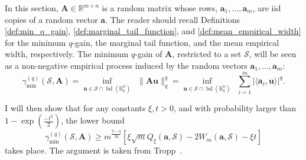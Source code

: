 In this section, $\mathbf{A} \in \mathbb{R}^{m \times n}$ is a random matrix whose rows, $\mathbf{a}_1, \dots, \mathbf{a}_m$, are \acrshort{iid} copies of a random vector $\mathbf{a}$. The reader should recall Definitions \ref{def:min_q_gain}, \ref{def:marginal_tail_function}, and \ref{def:mean_empirical_width} for the minimum $q$-gain, the marginal tail function, and the mean empirical width, respectively. The minimum $q$-gain of $\mathbf{A}$, restricted to a set $\mathcal{S}$, will be seen as a non-negative empirical process induced by the random vectors $\mathbf{a}_1, \dots, \mathbf{a}_m$:
\begin{equation*}
    \gamma_{\min}^{(q)} \left ( \mathcal{S}, \mathbf{A} \right ) = \underset{\mathbf{u} \in \mathcal{S} \cap \operatorname{bd}(\mathbb{B}^{n}_q)}{\inf} \enspace \|\mathbf{A u}\|_q^q = \underset{\mathbf{u} \in \mathcal{S} \cap \operatorname{bd}(\mathbb{B}^{n}_q)}{\inf} \enspace \sum_{i=1}^{m} \left | \langle \mathbf{a}_i, \mathbf{u} \rangle \right |^q.
\end{equation*}

I will then show that for any constants $\xi, t > 0$, and with probability larger than $1 - \exp \left ( \frac{-t^2}{2} \right )$, the lower bound
\begin{equation*}
    \gamma_{\min}^{(q)} \left ( \mathcal{S}, \mathbf{A} \right ) \geq m^{\frac{2 - q}{2q}} \left [ \xi \sqrt{m} Q_{\xi}(\mathbf{a}, \mathcal{S}) - 2 W_{m}(\mathbf{a}, \mathcal{S}) - \xi t \right ]
\end{equation*}
takes place. The argument is taken from Tropp~\cite[Sec. 2.5.5]{tropp2015a}.

